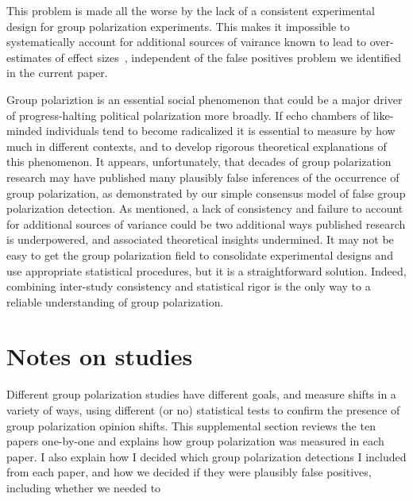 \documentclass[11pt, letterpaper]{article}
\begin{document}
This problem is made all the worse by the lack of a consistent experimental design for group
polarization experiments. This makes it impossible to systematically account for
additional sources of vairance known to lead to over-estimates
of effect sizes~\cite{Yarkoni2021}, independent of the false positives problem
we identified in the current paper. 


Group polariztion is an essential social phenomenon that could be a major driver of
progress-halting political polarization more broadly. If echo chambers of like-minded
individuals tend to become radicalized it is essential to measure by how much
in different contexts, and to develop rigorous theoretical explanations of
this phenomenon. It appears, unfortunately, that decades of group polarization
research may have published many plausibly false inferences of the
occurrence of group polarization, as demonstrated by our simple consensus
model of false group polarization detection. As mentioned, a lack of
consistency and failure to account for additional sources of variance could
be two additional ways published research is underpowered, and associated
theoretical insights undermined. It may not be easy to get the group polarization field to 
consolidate experimental designs and use appropriate statistical procedures,
but it is a straightforward solution. Indeed, combining inter-study consistency and statistical
rigor is the only way to a reliable understanding of group polarization.



\setlength{\bibleftmargin}{.125in}
\setlength{\bibindent}{-\bibleftmargin}



\appendix

\section{Notes on studies}

Different group polarization studies have different goals, and measure shifts
in a variety of ways, using different (or no) statistical tests to confirm
the presence of group polarization opinion shifts. This supplemental section
reviews the ten papers one-by-one and explains how group 
polarization was measured in each paper. I also explain how I decided which
group polarization detections I included from each paper, and how we decided
if they were plausibly false positives, including whether we needed to 
\end{document}
